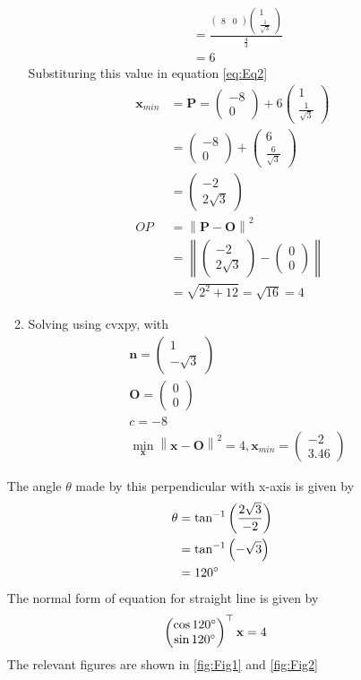 \documentclass[12pt]{article}
\providecommand{\brak}[1]{\ensuremath{\left(#1\right)}}
\providecommand{\norm}[1]{\left\lVert#1\right\rVert}
\newcommand{\myvec}[1]{\ensuremath{\begin{pmatrix}#1\end{pmatrix}}}
\let\vec\mathbf
\begin{document}
\begin{enumerate}
\begin{enumerate}
\begin{align}
	&= \frac{\myvec{8 & 0 }\myvec{1 \\ \frac{1}{\sqrt{3}}}}{\frac{4}{3}}\\ 
	&= 6
\end{align}
Substituring this value in equation \eqref{eq:Eq2}
\begin{align}
	\vec{x}_{min} &= \vec{P} = \myvec{-8 \\ 0}+6\myvec{1 \\ \frac{1}{\sqrt{3}}}  \\
	&= \myvec{-8 \\ 0}+\myvec{6 \\ \frac{6}{\sqrt{3}}} \\
	&= \myvec{-2 \\ 2\sqrt{3}} \\
	OP &= \norm{\vec{P}-\vec{O}}^2 \\ 
	&= \norm{\myvec{-2 \\ 2\sqrt{3}}-\myvec{0 \\ 0}} \\
	&= \sqrt{2^2 + 12} = \sqrt{16} = 4
\end{align}
\item Solving using cvxpy, with 
\begin{align}
	&\vec{n} = \myvec{1 \\ -\sqrt{3}} \\
	&\vec{O} = \myvec{0 \\ 0} \\
	&c = -8 \\
	\label{eq:minval}
	&  \min_{\vec{x}} \norm{\vec{x}-\vec{O}}^2 = 4, 
	 \vec{x}_{min} = \myvec{-2  \\ 3.46 } 
\end{align}
\end{enumerate}
The angle $\theta$ made by this perpendicular with x-axis is given by
\begin{align}
         \theta &= \tan^{-1}\brak{\frac{2\sqrt{3}}{-2}} \\
	 &= \tan^{-1}\brak{-\sqrt{3}} \\
	 &= 120\degree
\end{align}
The normal form of equation for straight line is given by
\begin{align}
	\myvec{\cos120\degree \\ \sin120\degree}^\top\vec{x} &= 4 
\end{align}
The relevant figures are shown in \ref{fig:Fig1} and \ref{fig:Fig2}
\begin{figure}[!h]
	\begin{center}

\end{center}
\end{figure}
\end{enumerate}
\end{document}
